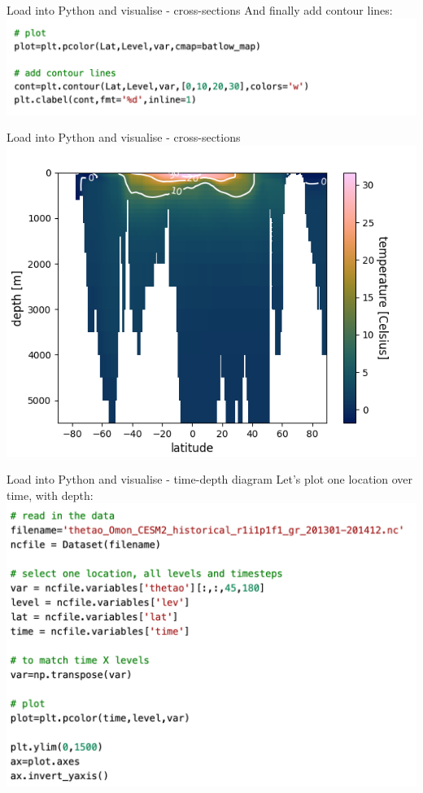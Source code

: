 \begin{frame}{\insertsectionnumber{ |} Load into Python and visualise - cross-sections}
    And finally add contour lines:\\
    \includegraphics[scale=0.35]{images/script2_step4.png}\\
\end{frame}


\begin{frame}{\insertsectionnumber{ |} Load into Python and visualise - cross-sections}
    \includegraphics[scale=0.45]{images/script1_fig9.png}
\end{frame}


\begin{frame}{\insertsectionnumber{ |} Load into Python and visualise - time-depth diagram} 
    Let's plot one location over time, with depth: \\
    \hbox{\hspace{-0.5cm}\includegraphics[scale=0.35]{images/Script3_step1.png}}
\end{frame}


